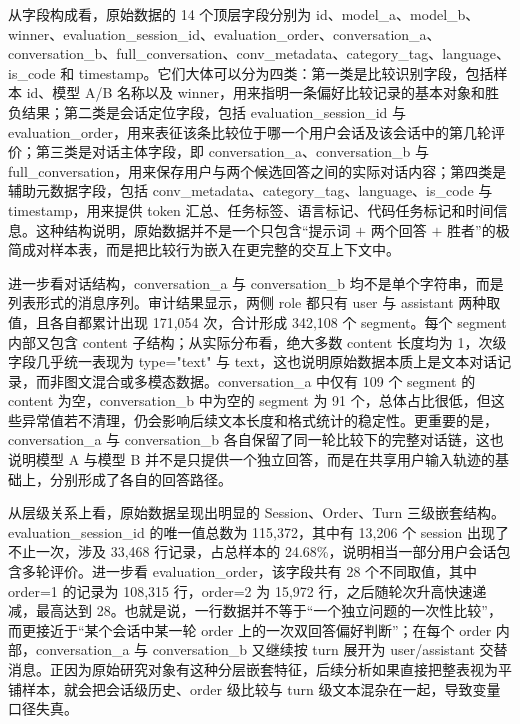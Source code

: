 \documentclass[9pt,a4paper,fontset=windows]{ctexart}
\theoremstyle{definition}
\numberwithin{equation}{section}
\begin{document}
从字段构成看，原始数据的 14 个顶层字段分别为 id、model\_a、model\_b、winner、evaluation\_session\_id、evaluation\_order、conversation\_a、conversation\_b、full\_conversation、conv\_metadata、category\_tag、language、is\_code 和 timestamp。它们大体可以分为四类：第一类是比较识别字段，包括样本 id、模型 A/B 名称以及 winner，用来指明一条偏好比较记录的基本对象和胜负结果；第二类是会话定位字段，包括 evaluation\_session\_id 与 evaluation\_order，用来表征该条比较位于哪一个用户会话及该会话中的第几轮评价；第三类是对话主体字段，即 conversation\_a、conversation\_b 与 full\_conversation，用来保存用户与两个候选回答之间的实际对话内容；第四类是辅助元数据字段，包括 conv\_metadata、category\_tag、language、is\_code 与 timestamp，用来提供 token 汇总、任务标签、语言标记、代码任务标记和时间信息。这种结构说明，原始数据并不是一个只包含“提示词 \(+\) 两个回答 \(+\) 胜者”的极简成对样本表，而是把比较行为嵌入在更完整的交互上下文中。

进一步看对话结构，conversation\_a 与 conversation\_b 均不是单个字符串，而是列表形式的消息序列。审计结果显示，两侧 role 都只有 user 与 assistant 两种取值，且各自都累计出现 171,054 次，合计形成 342,108 个 segment。每个 segment 内部又包含 content 子结构；从实际分布看，绝大多数 content 长度均为 1，次级字段几乎统一表现为 type="text" 与 text，这也说明原始数据本质上是文本对话记录，而非图文混合或多模态数据。conversation\_a 中仅有 109 个 segment 的 content 为空，conversation\_b 中为空的 segment 为 91 个，总体占比很低，但这些异常值若不清理，仍会影响后续文本长度和格式统计的稳定性。更重要的是，conversation\_a 与 conversation\_b 各自保留了同一轮比较下的完整对话链，这也说明模型 A 与模型 B 并不是只提供一个独立回答，而是在共享用户输入轨迹的基础上，分别形成了各自的回答路径。

从层级关系上看，原始数据呈现出明显的 Session、Order、Turn 三级嵌套结构。evaluation\_session\_id 的唯一值总数为 115,372，其中有 13,206 个 session 出现了不止一次，涉及 33,468 行记录，占总样本的 24.68\%，说明相当一部分用户会话包含多轮评价。进一步看 evaluation\_order，该字段共有 28 个不同取值，其中 order=1 的记录为 108,315 行，order=2 为 15,972 行，之后随轮次升高快速递减，最高达到 28。也就是说，一行数据并不等于“一个独立问题的一次性比较”，而更接近于“某个会话中某一轮 order 上的一次双回答偏好判断”；在每个 order 内部，conversation\_a 与 conversation\_b 又继续按 turn 展开为 user/assistant 交替消息。正因为原始研究对象有这种分层嵌套特征，后续分析如果直接把整表视为平铺样本，就会把会话级历史、order 级比较与 turn 级文本混杂在一起，导致变量口径失真。
\end{document}
